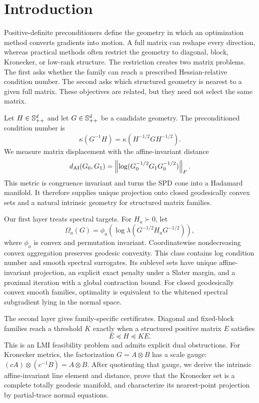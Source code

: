 \section{Introduction}

Positive-definite preconditioners define the geometry in which an optimization
method converts gradients into motion.  A full matrix can reshape every
direction, whereas practical methods often restrict the geometry to diagonal,
block, Kronecker, or low-rank structure.  The restriction creates two matrix
problems.  The first asks whether the family can reach a prescribed
Hessian-relative condition number.  The second asks which structured geometry
is nearest to a given full matrix.  These objectives are related, but they
need not select the same matrix.

Let \(H\in\mathbb S_{++}^d\) and let \(G\in\mathbb S_{++}^d\) be a candidate geometry.  The
preconditioned condition number is
\[
  \kappa(G^{-1}H)
  =
  \kappa(H^{-1/2}GH^{-1/2}).
\]
We measure matrix displacement with the affine-invariant distance
\[
  d_{\mathrm{AI}}(G_0,G_1)
  =
  \left\lVert \log(G_0^{-1/2}G_1G_0^{-1/2})\right\rVert_F.
\]
This metric is congruence invariant and turns the SPD cone into a Hadamard
manifold.  It therefore supplies unique projection onto closed geodesically
convex sets and a natural intrinsic geometry for structured matrix families.

Our first layer treats spectral targets.  For \(H_a\succ0\), let
\[
  \Omega_a(G)
  =
  \phi_a\!\left(
  \log\lambda(G^{-1/2}H_aG^{-1/2})
  \right),
\]
where \(\phi_a\) is convex and permutation invariant.  Coordinatewise
nondecreasing convex aggregation preserves geodesic convexity.  This class
contains log condition number and smooth spectral surrogates.  Its sublevel
sets have unique affine-invariant projection, an explicit exact penalty under
a Slater margin, and a proximal iteration with a global contraction bound.
For closed geodesically convex smooth families, optimality is equivalent to
the whitened spectral subgradient lying in the normal space.

The second layer gives family-specific certificates.  Diagonal and fixed-block
families reach a threshold \(K\) exactly when a structured positive matrix
\(E\) satisfies
\[
  E\preceq H\preceq KE.
\]
This is an LMI feasibility problem and admits explicit dual obstructions.
For Kronecker metrics, the factorization \(G=A\otimes B\) has a scale gauge:
\((cA)\otimes(c^{-1}B)=A\otimes B\).  After quotienting that gauge, we derive
the intrinsic affine-invariant line element and distance, prove that the
Kronecker set is a complete totally geodesic manifold, and characterize its
nearest-point projection by partial-trace normal equations.

